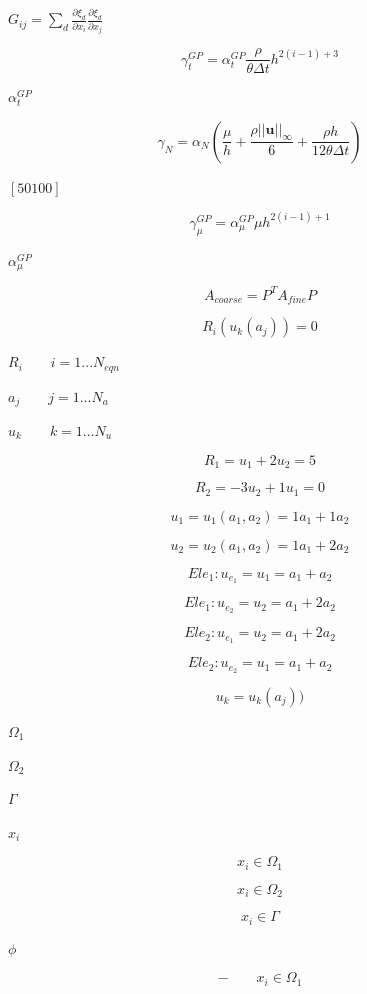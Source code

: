 \documentclass{article}
\begin{document}
$ G_{ij} = \sum_d \frac{\partial \xi_d}{\partial x_i} \frac{\partial \xi_d}{\partial x_j} $
\pagebreak

\[
\gamma_{t}^{GP} = \alpha_{t}^{GP} \frac{\rho}{\theta \Delta t} h^{2(i-1)+3}
\]
\pagebreak

$ \alpha_{t}^{GP} $
\pagebreak

\[
\gamma_N = \alpha_N \left( 
\frac{\mu}{h} 
+ \frac{\rho || \mathbf{u} ||_{\infty}}{ 6 } 
+ \frac{\rho h}{12 \theta \Delta t} 
\right)
\]
\pagebreak

$ [ 50 100 ] $
\pagebreak

\[
\gamma_{\mu}^{GP} = \alpha_{\mu}^{GP} \mu h^{2(i-1)+1}
\]
\pagebreak

$ \alpha_{\mu}^{GP} $
\pagebreak

\[ A_{coarse} = P^T A_{fine} P \]
\pagebreak

\[ R_i(u_k(a_j)) = 0 \]
\pagebreak

$ R_i  \qquad i=1...N_{eqn} $
\pagebreak

$ a_j  \qquad j=1...N_a $
\pagebreak

$ u_k  \qquad k=1...N_u $
\pagebreak

\[ R_1 = u_{1} + 2u_{2} = 5 \]
\pagebreak

\[ R_2 = -3u_{2} + 1u_{1} = 0 \]
\pagebreak

\[u_1 = u_1(a_1, a_2) = 1a_1 + 1a_2 \]
\pagebreak

\[u_2 = u_2(a_1, a_2) = 1a_1 + 2a_2 \]
\pagebreak

\[Ele_1 : u_{e_1} = u_1 = a_1 + a_2 \]
\pagebreak

\[Ele_1 : u_{e_2} = u_2 = a_1 + 2a_2 \]
\pagebreak

\[Ele_2 : u_{e_1} = u_2 = a_1 + 2a_2 \]
\pagebreak

\[Ele_2 : u_{e_2} = u_1 = a_1 + a_2 \]
\pagebreak

\[ u_k=u_k(a_j)) \]
\pagebreak

$ \Omega_1 $
\pagebreak

$ \Omega_2 $
\pagebreak

$ \Gamma $
\pagebreak

$ x_i $
\pagebreak

\[         x_i \in \Omega_1    \]
\pagebreak

\[         x_i \in \Omega_2    \]
\pagebreak

\[         x_i \in \Gamma      \]
\pagebreak

$ \phi $
\pagebreak

\[ - \qquad            x_i \in \Omega_1    \]
\pagebreak
\end{document}
